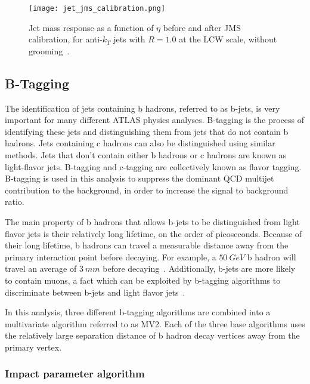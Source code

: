 \begin{figure}[!ht]
    \centering
\texttt{[image: jet\_jms\_calibration.png]}
\caption{Jet mass response as a function of $\eta$ before and after JMS calibration, for anti-$k_T$ jets
with $R=1.0$ at the LCW scale, without grooming~\cite{jet-substructure-perf}.}
\label{fig:jet_jms_response}
\end{figure}

\subsection{B-Tagging}\label{subsec:jet_b_tagging}

The identification of jets containing b hadrons, referred to as b-jets, is very important for many different ATLAS physics analyses.
B-tagging is the process of identifying these jets and distinguishing them from jets that do not contain b hadrons.
Jets containing c hadrons can also be distinguished using similar methods.
Jets that don't contain either b hadrons or c hadrons are known as light-flavor jets.
B-tagging and c-tagging are collectively known as flavor tagging.
B-tagging is used in this analysis to suppress the dominant QCD multijet contribution to the background, in order to increase the signal to background ratio.

The main property of b hadrons that allows b-jets to be distinguished from light flavor jets is their relatively long lifetime, on the order of picoseconds.
Because of their long lifetime, b hadrons can travel a measurable distance away from the primary interaction point before decaying.
For example, a $50~GeV$ b hadron will travel an average of $3~mm$ before decaying~\cite{jet-bjet-perf}.
Additionally, b-jets are more likely to contain muons, a fact which can be exploited by b-tagging
algorithms to discriminate between b-jets and light flavor jets~\cite{jet-bjet-perf}.

In this analysis, three different b-tagging algorithms are combined into a multivariate algorithm referred to as MV2.
Each of the three base algorithms uses the relatively large separation distance of b hadron decay vertices away from the primary vertex.

\subsubsection{Impact parameter algorithm}\label{subsubsec:jet_btag_ip}

